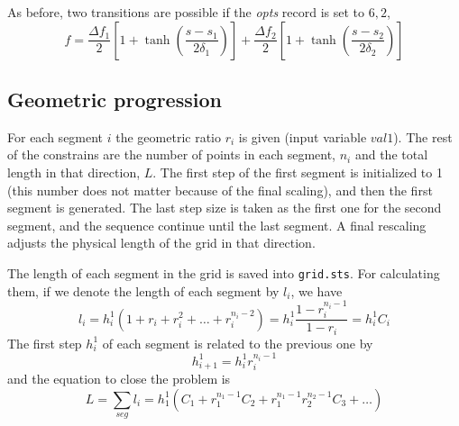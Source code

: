 As before, two transitions are possible if the {\it opts} record is set to $6,2$,
\begin{equation}
f = \frac{\Delta f_1}{2}\left[ 1 + \tanh\left(\frac{s-s_1}{2\delta_1}\right)\right]
+ \frac{\Delta f_2}{2}\left[ 1 + \tanh\left(\frac{s-s_2}{2\delta_2}\right)\right]
\end{equation}

\subsection{Geometric progression}
For each segment $i$ the geometric ratio $r_i$ is given (input variable
$val1$). The rest of the constrains are the number of points in each segment,
$n_i$ and the total length in that direction, $L$.  The first step of the first
segment is initialized to 1 (this number does not matter because of the final
scaling), and then the first segment is generated. The last step size is taken
as the first one for the second segment, and the sequence continue until the
last segment. A final rescaling adjusts the physical length of the grid in that
direction.

The length of each segment in the grid is saved into {\tt grid.sts}. For
calculating them, if we denote the length of each segment by $l_i$, we have
\begin{equation}
l_i = h_i^1(1+r_i+r_i^2+\ldots+r_i^{n_i-2})=
h_i^1\frac{1-r_i^{n_i-1}}{1-r_i}=h_i^1C_i
\end{equation}
The first step $h_i^1$ of each segment is related to the previous one by
\begin{equation}
h_{i+1}^1 = h_i^1 r_i^{n_i-1}
\end{equation}
and the equation to close the problem is
\begin{equation}
L=\sum_{seg}l_i=h_1^1\left( C_1 + r_1^{n_1-1}C_2 + 
r_1^{n_1-1}r_2^{n_2-1}C_3 + \ldots \right)
\end{equation}

